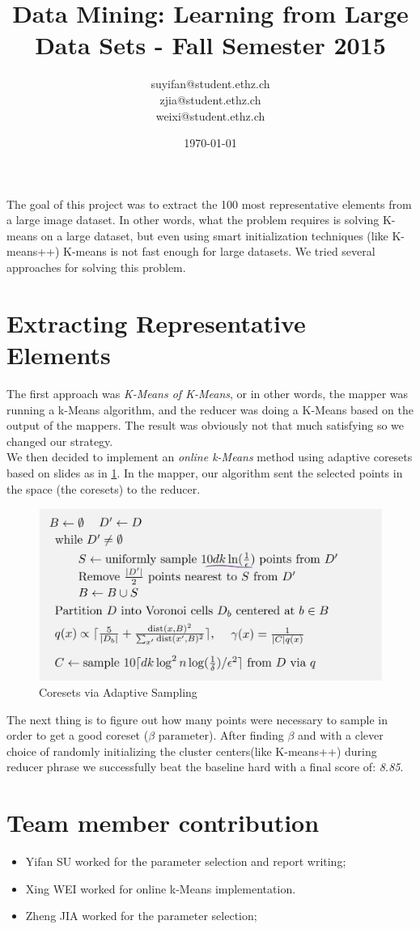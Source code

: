 \documentclass[a4paper, 11pt]{article}
\title{Data Mining: Learning from Large Data Sets - Fall Semester 2015}
\author{suyifan@student.ethz.ch\\ zjia@student.ethz.ch\\ weixi@student.ethz.ch\\}
\date{\today}
\begin{document}
\maketitle
The goal of this project was to extract the 100 most representative elements from a large image dataset. In other words, what the problem requires is solving K-means on a large dataset, but even using smart initialization techniques (like K-means++) K-means is not fast enough for large datasets. We tried several approaches for solving this problem.

\section*{Extracting Representative Elements} 
The first approach was \emph{K-Means of K-Means}, or in other words, the mapper was running a k-Means algorithm, and the reducer was doing a K-Means based on the output of the mappers. The result was obviously not that much satisfying so we changed our strategy. \\

We then decided to implement an \emph{online k-Means} method using adaptive coresets based on slides as in \cref{fig:formula}. In the mapper, our algorithm sent the selected points in the space (the coresets) to the reducer.
\begin{figure}[!htb]
  \includegraphics[width=4.5in]{formula}
  \centering
  \caption{Coresets via Adaptive Sampling}
  \label{fig:formula}
\end{figure}
The next thing is to figure out how many points were necessary to sample in order to get a good coreset ($\beta \text{ parameter}$). After finding $\beta$ and with a clever choice of randomly initializing the cluster centers(like K-means++) during reducer phrase we successfully beat the baseline hard with a final score of: \emph{8.85}.

\section*{Team member contribution} 
\begin{itemize}
  \item Yifan SU worked for the parameter selection and report writing;
  \item Xing WEI worked for online k-Means implementation.
  \item Zheng JIA worked for the parameter selection;
\end{itemize}
\end{document}
